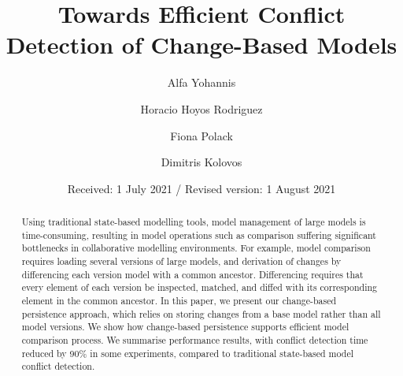 
\renewcommand{\labelitemi}{$\bullet$}
\newcommand{\AndA}{\textnormal{\textbf{and }}}
\newcommand{\Is}{\textnormal{\textbf{is }}}
\newcommand{\Not}{\textnormal{\textbf{not }}}
\newcommand{\In}{\textnormal{\textbf{in }}}
\newcommand{\Or}{\textnormal{\textbf{or }}}
\newcommand{\eqnum}{\refstepcounter{equation}\textup{\tagform@{\theequation}}}

%
%

%
\title{Towards Efficient Conflict Detection of Change-Based Models}
\author{Alfa Yohannis \and Horacio Hoyos Rodriguez \and Fiona Polack \and Dimitris Kolovos%
}                     %
%
\offprints{}          %
%
%
\date{Received: 1 July 2021 / Revised version: 1 August 2021}
%
\maketitle
%
\begin{abstract}
Using traditional state-based modelling tools, model management of large models is time-consuming, resulting in model operations such as comparison suffering significant bottlenecks in collaborative modelling environments.  For example, model comparison requires loading several versions of large models, and derivation of changes by differencing each version model with a common ancestor.  Differencing requires that every element of each version be inspected, matched, and diffed with its corresponding element in the common ancestor. In this paper, we present our change-based persistence approach, which relies on storing changes from a base model rather than all model versions. We show how change-based persistence supports efficient model comparison process. We summarise performance results, with conflict detection time reduced by 90\% in some experiments, compared to traditional state-based model conflict detection.
\end{abstract}
%

